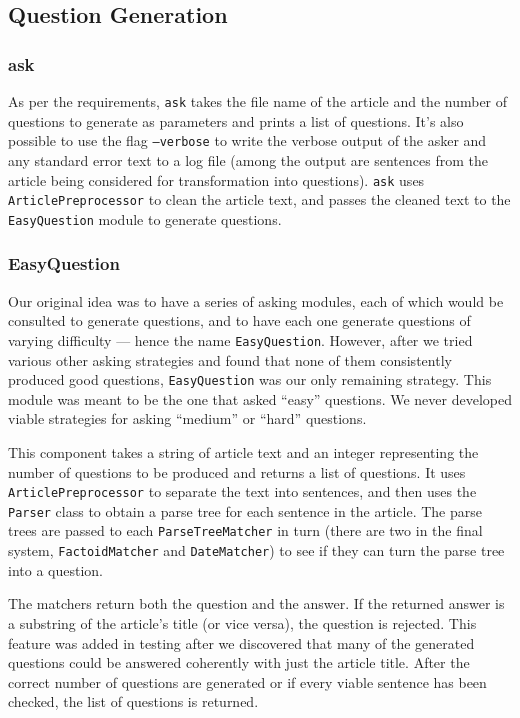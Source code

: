 \documentclass[11pt]{article}
\begin{document}
\subsection{Question Generation}
\subsubsection{ask}

As per the requirements, \texttt{ask} takes the file name of the article and the
number of questions to generate as parameters and prints a list of questions.
It's also possible to use the flag {\tt --verbose} to write the verbose output
of the asker and any standard error text to a log file (among the output are
sentences from the article being considered for transformation into questions).
\texttt{ask} uses \texttt{ArticlePreprocessor} to clean the article text, and
passes the cleaned text to the \texttt{EasyQuestion} module to generate
questions.

\subsubsection{EasyQuestion}

Our original idea was to have a series of asking modules, each of which would be
consulted to generate questions, and to have each one generate questions of
varying difficulty --- hence the name \texttt{EasyQuestion}. However, after we
tried various other asking strategies and found that none of them consistently
produced good questions, \texttt{EasyQuestion} was our only remaining strategy.
This module was meant to be the one that asked ``easy'' questions. We never
developed viable strategies for asking ``medium'' or ``hard'' questions.

This component takes a string of article text and an integer representing the
number of questions to be produced and returns a list of questions. It uses
\texttt{ArticlePreprocessor} to separate the text into sentences, and then uses
the \texttt{Parser} class to obtain a parse tree for each sentence in the
article. The parse trees are passed to each \texttt{ParseTreeMatcher} in turn
(there are two in the final system, \texttt{FactoidMatcher} and
\texttt{DateMatcher}) to see if they can turn the parse tree into a question.

The matchers return both the question and the answer. If the returned answer is
a substring of the article's title (or vice versa), the question is rejected.
This feature was added in testing after we discovered that many of the generated
questions could be answered coherently with just the article title. After the
correct number of questions are generated or if every viable sentence has been
checked, the list of questions is returned.
\end{document}
